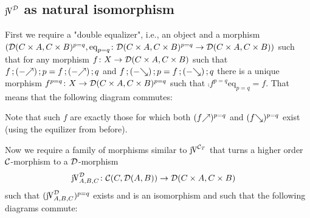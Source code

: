 \documentclass[runningheads,envcountsame]{llncs}
\begin{document}
\subsection{$\juncurry[\D]$ as natural isomorphism}

First we require a "double equalizer", i.e., an object and a morphism $(\mathcal{D}(C \times A, C \times B)^{p=q}, \mathrm{eq}_{p=q}\colon \mathcal{D}(C \times A, C \times B)^{p=q} \to \mathcal{D}(C \times A, C \times B))$ such that for any morphism $f\colon X \to  \mathcal{D}(C \times A, C \times B)$ such that $\comp{f}{\comp{(\f{-})}{p}} = \comp{f}{\comp{(\f{-})}{q}}$ and $\comp{f}{\comp{(\b{-})}{p}} = \comp{f}{\comp{(\b{-})}{q}}$ there is a unique morphism $f^{p=q}\colon X \to \mathcal{D}(C \times A, C \times B)^{p=q}$ such that $\comp{f^{p=q}}{\mathrm{eq}_{p=q}} = f$. That means that the following diagram commutes:


Note that such $f$ are exactly those for which both $(\f{f})^{p=q}$ and $(\b{f})^{p=q}$ exist (using the equilizer from before).

Now we require a family of morphisms similar to $\juncurry[\C_T]$ that turns a higher order $\mathcal{C}$-morphism to a $\mathcal{D}$-morphism
\begin{align}
\juncurry[\D]_{A,B,C} &\colon \homC{C}{\homD{A}{B}} \to \homD{C \times A}{C \times B}
\end{align}
such that $(\juncurry[\D]_{A,B,C})^{p=q}$ exists and is an isomorphism and such that the following diagrams commute:

\end{document}
